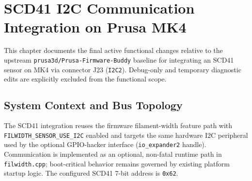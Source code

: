 \chapter{SCD41 I2C Communication Integration on Prusa MK4}
\label{chap:scd41-i2c}

This chapter documents the final active functional changes relative to the upstream \texttt{prusa3d/Prusa-Firmware-Buddy} baseline for integrating an SCD41 sensor on MK4 via connector J23 (\texttt{I2C2}). Debug-only and temporary diagnostic edits are explicitly excluded from the functional scope.

\section{System Context and Bus Topology}
The SCD41 integration reuses the firmware filament-width feature path with \texttt{FILWIDTH\_SENSOR\_USE\_I2C} enabled and targets the same hardware I2C peripheral used by the optional GPIO-hacker interface (\texttt{io\_expander2} handle). Communication is implemented as an optional, non-fatal runtime path in \texttt{filwidth.cpp}; boot-critical behavior remains governed by existing platform startup logic. The configured SCD41 7-bit address is \texttt{0x62}.

